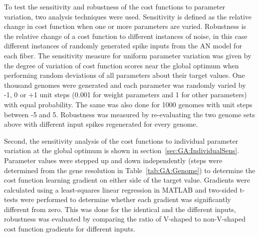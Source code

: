 \smallskip{}

To test the sensitivity and robustness of the cost functions to
parameter variation, two analysis techniques were used. Sensitivity is
defined as the relative change in cost function when one or more
parameters are varied.  Robustness is the relative change of a cost
function to different instances of noise, in this case different
instances of randomly generated spike inputs from the AN model for
each fiber.  The sensitivity measure for uniform parameter variation
was given by the degree of variation of cost function scores near the
global optimum when performing random deviations of all parameters
about their target values. One thousand genomes were generated and
each parameter was randomly varied by -1, 0 or +1 unit steps (0.001
for weight parameters and 1 for other parameters) with equal
probability. The same was also done for 1000 genomes with unit steps
between -5 and 5.  Robustness was measured by re-evaluating the two
genome sets above with different {\ANF} input spikes regenerated for
every genome.

\smallskip{}

Second, the sensitivity analysis of the cost functions to individual
parameter variation at the global optimum is shown in
section~\ref{sec:GA:IndividualSens}. Parameter values were stepped up
and down independently (steps were determined from the gene resolution
in Table~\ref{tab:GA:Genome}) to determine the cost function learning
gradient on either side of the target value. Gradients were calculated
using a least-squares linear regression in MATLAB and two-sided
t-tests were performed to determine whether each gradient was
significantly different from zero.  This was done for the identical
and the different {\ANF} inputs, robustness was evaluated by comparing
the ratio of V-shaped to non-V-shaped cost function gradients for
different inputs.







